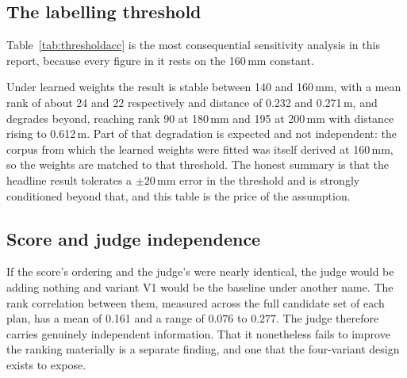 \subsection{The labelling threshold}

Table~\ref{tab:thresholdacc} is the most consequential sensitivity analysis
in this report, because every figure in it rests on the 160\,mm constant.

\begin{table}[H]
\centering
\caption[Sensitivity to the labelling threshold]{Sensitivity to the
load-bearing threshold. The labels are re-derived from each plan's own wall
thicknesses at each value and the accuracy re-measured. ``Label cols.'' is
the mean number of columns in the resulting label.}
\label{tab:thresholdacc}
\scriptsize

\end{table}

Under learned weights the result is stable between 140 and 160\,mm, with a
mean rank of about 24 and 22 respectively and distance of 0.232 and
0.271\,m, and degrades beyond, reaching rank 90 at 180\,mm and 195 at
200\,mm with distance rising to 0.612\,m. Part of that degradation is
expected and not independent: the corpus from which the learned weights
were fitted was itself derived at 160\,mm, so the weights are matched to
that threshold. The honest summary is that the headline result tolerates a
$\pm 20$\,mm error in the threshold and is strongly conditioned beyond
that, and this table is the price of the assumption.

\subsection{Score and judge independence}

If the score's ordering and the judge's were nearly identical, the judge
would be adding nothing and variant V1 would be the baseline under another
name. The rank correlation between them, measured across the full candidate
set of each plan, has a mean of 0.161 and a range of $0.076$ to $0.277$.
The judge therefore carries genuinely independent information. That it
nonetheless fails to improve the ranking materially is a separate finding,
and one that the four-variant design exists to expose.
